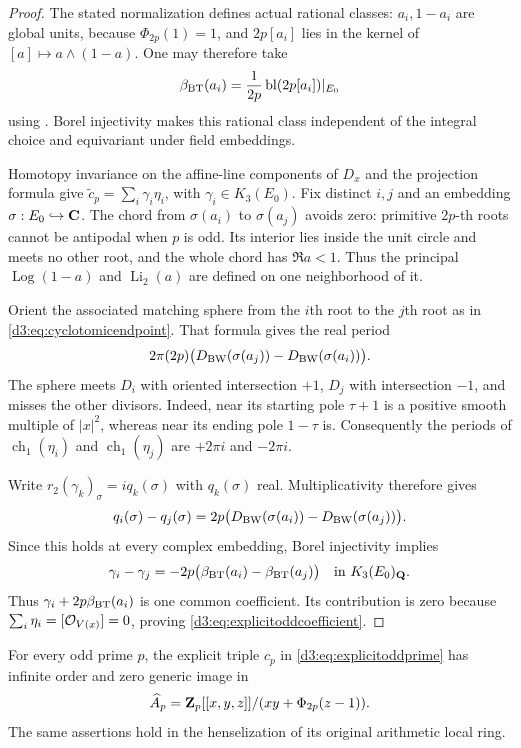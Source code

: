 \begin{proof}
The stated normalization defines actual rational classes:
$a_i,1-a_i$ are global units, because $\Phi_{2p}(1)=1$,
and $2p[a_i]$ lies in the kernel of
$[a]\mapsto a\wedge(1-a)$.
One may therefore take
\[
 \beta_{\rm BT}(a_i)=\frac1{2p}\operatorname{bl}(2p[a_i])|_{E_0}
\]
using \cite[Theorem~4.9 and identification~(4.8)]{BunkeTamme}.
Borel injectivity \cite[Section~6]{BunkeTamme} makes this rational class independent of the
integral choice and equivariant under field embeddings.

Homotopy invariance on the affine-line components of $D_x$ and
the projection formula give
$\widetilde c_p=\sum_i\gamma_i\eta_i$, with
$\gamma_i\in K_3(E_0)$.
Fix distinct $i,j$ and an embedding $\sigma:E_0\hookrightarrow\mathbf C$.
The chord from $\sigma(a_i)$ to $\sigma(a_j)$ avoids zero:
primitive $2p$-th roots cannot be antipodal when $p$ is odd.
Its interior lies inside the unit circle and meets no other root,
and the whole chord has $\Re a<1$. Thus the principal
$\operatorname{Log}(1-a)$ and $\operatorname{Li}_2(a)$ are defined
on one neighborhood of it.

Orient the associated matching sphere from the $i$th root to
the $j$th root as in \eqref{d3:eq:cyclotomicendpoint}.
That formula gives the real period
\[
 2\pi(2p)\bigl(D_{\rm BW}(\sigma(a_j))
                  -D_{\rm BW}(\sigma(a_i))\bigr).
\]
The sphere meets $D_i$ with oriented intersection $+1$,
$D_j$ with intersection $-1$, and misses the other divisors.
Indeed, near its starting pole $\tau+1$ is a positive smooth
multiple of $|x|^2$, whereas near its ending pole $1-\tau$ is.
Consequently the periods of $\operatorname{ch}_1(\eta_i)$
and $\operatorname{ch}_1(\eta_j)$ are $+2\pi i$ and $-2\pi i$.

Write $r_2(\gamma_k)_\sigma=iq_k(\sigma)$ with $q_k(\sigma)$ real.
Multiplicativity therefore gives
\[
 q_i(\sigma)-q_j(\sigma)
 =2p\bigl(D_{\rm BW}(\sigma(a_i))
                  -D_{\rm BW}(\sigma(a_j))\bigr).
\]
Since this holds at every complex embedding, Borel injectivity
implies
\[
 \gamma_i-\gamma_j
 =-2p\bigl(\beta_{\rm BT}(a_i)-\beta_{\rm BT}(a_j)\bigr)
 \quad\text{in }K_3(E_0)_{\mathbf Q}.
\]
Thus $\gamma_i+2p\beta_{\rm BT}(a_i)$ is one common coefficient.
Its contribution is zero because
$\sum_i\eta_i=[\mathcal O_{V(x)}]=0$, proving
\eqref{d3:eq:explicitoddcoefficient}.
\end{proof}

\begin{proposition}\label{d3:prop:explicitoddcomplete}
For every odd prime $p$, the explicit triple $c_p$ in
\eqref{d3:eq:explicitoddprime} has infinite order and zero generic
image in
\[
 \widehat A_p=\mathbf Z_p[[x,y,z]]/(xy+\Phi_{2p}(z-1)).
\]
The same assertions hold in the henselization of its original
arithmetic local ring.
\end{proposition}

